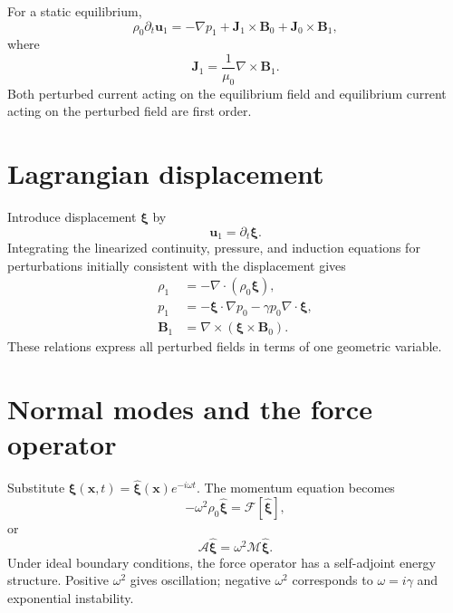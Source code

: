 \documentclass[11pt]{article}
\begin{document}
For a static equilibrium,
\begin{equation}
\rho_0\partial_t\mathbf u_1
=-\nabla p_1+\mathbf J_1\times\mathbf B_0+\mathbf J_0\times\mathbf B_1,
\end{equation}
where
\begin{equation}
\mathbf J_1=\frac{1}{\mu_0}\nabla\times\mathbf B_1.
\end{equation}
Both perturbed current acting on the equilibrium field and equilibrium current acting on the perturbed field are first order.


\section{Lagrangian displacement}

Introduce displacement $\boldsymbol\xi$ by
\begin{equation}
\mathbf u_1=\partial_t\boldsymbol\xi.
\end{equation}
Integrating the linearized continuity, pressure, and induction equations for perturbations initially consistent with the displacement gives
\begin{align}
\rho_1&=-\nabla\cdot(\rho_0\boldsymbol\xi),\\
p_1&=-\boldsymbol\xi\cdot\nabla p_0-\gamma p_0\nabla\cdot\boldsymbol\xi,\\
\mathbf B_1&=\nabla\times(\boldsymbol\xi\times\mathbf B_0).
\end{align}
These relations express all perturbed fields in terms of one geometric variable.


\section{Normal modes and the force operator}

Substitute $\boldsymbol\xi(\mathbf x,t)=\hat{\boldsymbol\xi}(\mathbf x)e^{-i\omega t}$. The momentum equation becomes
\begin{equation}
-\omega^2\rho_0\hat{\boldsymbol\xi}
=\mathcal F[\hat{\boldsymbol\xi}],
\end{equation}
or
\begin{equation}
\mathcal A\hat{\boldsymbol\xi}
=\omega^2\mathcal M\hat{\boldsymbol\xi}.
\end{equation}
Under ideal boundary conditions, the force operator has a self-adjoint energy structure. Positive $\omega^2$ gives oscillation; negative $\omega^2$ corresponds to $\omega=i\gamma$ and exponential instability.
\end{document}
